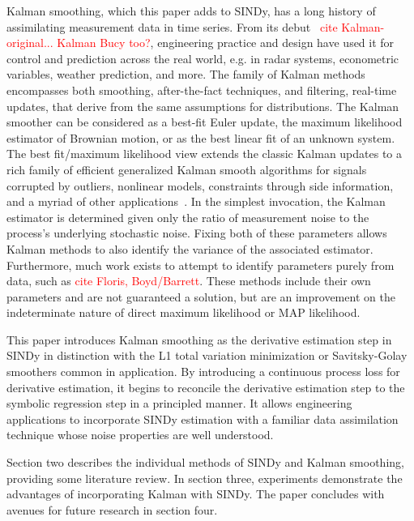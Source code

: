 \documentclass{article}
\newcommand{\red}[1]{\textcolor{red}{#1}}
\begin{document}
Kalman smoothing, which this paper adds to SINDy, has a long history of assimilating measurement data in time series.
From its debut~\cite{Kalman1960, KalBuc}
\red{cite Kalman-original... Kalman Bucy too?},
engineering practice and design have used it for control and prediction across the real world, e.g. in radar systems, econometric variables, weather prediction, and more.
The family of Kalman methods encompasses both smoothing, after-the-fact techniques, and filtering, real-time updates, that derive from the same assumptions for distributions.
The Kalman smoother can be considered as a best-fit Euler update, the maximum likelihood estimator of Brownian motion, or as the best linear fit of an unknown system. The best fit/maximum likelihood view extends the classic Kalman updates to a rich family of efficient generalized Kalman smooth algorithms for signals corrupted by outliers, nonlinear models, constraints through side information, and a myriad of other applications~\cite{aravkin2017generalized}.
In the simplest invocation, the Kalman estimator is determined given only the ratio of measurement noise to the process's underlying stochastic noise.
Fixing both of these parameters allows Kalman methods to also identify the variance of the associated estimator.
Furthermore, much work exists to attempt to identify parameters purely from data, such as \red{cite Floris, Boyd/Barrett}.
These methods include their own parameters and are not guaranteed a solution, but are an improvement on the indeterminate nature of direct maximum likelihood or MAP likelihood.

This paper introduces Kalman smoothing as the derivative estimation step in SINDy in distinction with the L1 total variation minimization or Savitsky-Golay smoothers common in application.
By introducing a continuous process loss for derivative estimation, it begins to reconcile the derivative estimation step to the symbolic regression step in a principled manner.
It allows engineering applications to incorporate SINDy estimation with a familiar data assimilation technique whose noise properties are well understood.

Section two describes the individual methods of SINDy and Kalman smoothing, providing some literature review.  In section three, experiments demonstrate the advantages of incorporating Kalman with SINDy.  The paper concludes with avenues for future research in section four.
\end{document}
